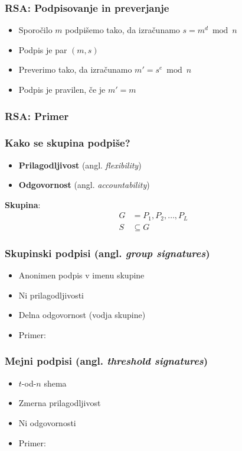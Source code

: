 \documentclass{beamer}    %
\begin{document}
\begin{frame}
    \frametitle{RSA: Podpisovanje in preverjanje}
    \begin{itemize}
        \item Sporočilo $m$ podpišemo tako, da izračunamo $s = m^d \bmod n$
        \item Podpis je par $(m, s)$
    \end{itemize}
    
    \vspace{1cm}
    \begin{itemize}
        \item Preverimo tako, da izračunamo $m' = s^e \bmod n$
        \item Podpis je pravilen, če je $m' = m$
    \end{itemize}
\end{frame}

\begin{frame}
    \frametitle{RSA: Primer}
\end{frame}

\begin{frame}
    \frametitle{Kako se skupina podpiše?}
    \begin{itemize}
        \item \textbf{Prilagodljivost} (angl. \textit{flexibility})
        \item \textbf{Odgovornost} (angl. \textit{accountability})
    \end{itemize}
    \vspace{1cm}
    \textbf{Skupina}: 
    \begin{align*}
        G &= P_1, P_2, \dots, P_L \\
        S &\subseteq G
    \end{align*}
\end{frame}

\begin{frame}
    \frametitle{Skupinski podpisi (angl. \textit{group signatures})}
    \begin{itemize}
        \item Anonimen podpis v imenu skupine
        \item Ni prilagodljivosti
        \item Delna odgovornost (vodja skupine)
        \item Primer: 
    \end{itemize}
\end{frame}

\begin{frame}
    \frametitle{Mejni podpisi (angl. \textit{threshold signatures})}
    \begin{itemize}
        \item $t$-od-$n$ shema
        \item Zmerna prilagodljivost
        \item Ni odgovornosti
        \item Primer: 
    \end{itemize}
\end{frame}
\end{document}
